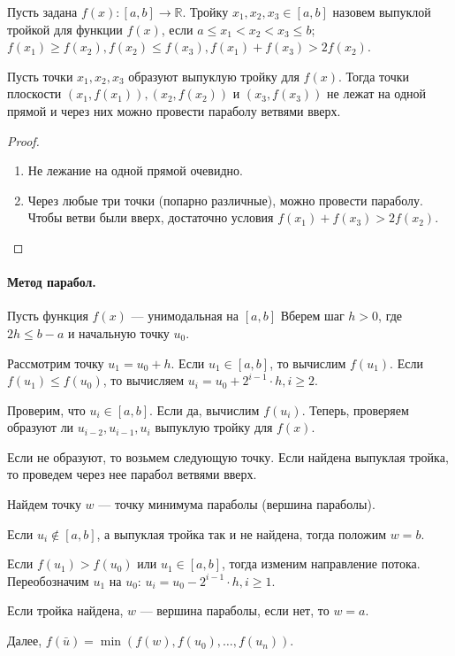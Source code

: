 
\begin{definition}
	Пусть задана $f(x): [a, b] \to \mathbb{R}$. Тройку $x_1, x_2, x_3 \in [a, b]$ назовем выпуклой тройкой для функции $f(x)$, если $a \leqslant x_1 < x_2 < x_3 \leqslant b$; $f(x_1) \geqslant f(x_2), f(x_2) \leqslant f(x_3), f(x_1) + f(x_3) > 2 f(x_2)$. 
\end{definition}

\begin{utv}
	Пусть точки $x_1, x_2, x_3$ образуют выпуклую тройку для $f(x)$.
  Тогда точки плоскости $(x_1, f(x_1)), (x_2, f(x_2))$ и $(x_3, f(x_3))$ не лежат на одной прямой и
  через них можно провести параболу ветвями вверх. 
\end{utv}
\begin{proof}
  \begin{enumerate}
    \item Не лежание на одной прямой очевидно. 
    \item Через любые три точки (попарно различные), можно провести параболу. 
      Чтобы ветви были вверх, достаточно условия $ f(x_1) + f(x_3) > 2 f(x_2)$.
  \end{enumerate}
\end{proof}

\paragraph{Метод парабол.} Пусть функция $f(x)$ --- унимодальная на $[a, b]$ Вберем шаг $h > 0$, где $2 h \leqslant b - a$ и начальную точку $u_0$.

Рассмотрим точку $u_1 = u_0 + h$. Если $u_1 \in [a, b]$, то вычислим $f(u_1)$. Если $f(u_1) \leqslant f(u_0)$, то вычисляем $u_i = u_0 + 2^{i - 1} \cdot h, i \geqslant 2$. 

Проверим, что $u_i \in [a, b]$. Если да, вычислим $f(u_i)$. Теперь, проверяем образуют ли $u_{i - 2}, u_{i - 1}, u_i$ выпуклую тройку для $f(x)$.

Если не образуют, то возьмем следующую точку. Если найдена выпуклая тройка, то проведем через нее парабол ветвями вверх. 

Найдем точку $w$ --- точку минимума параболы (вершина параболы). 

Если $u_i \not \in [a, b]$, а выпуклая тройка так и не найдена, тогда положим $w = b$. 

Если $f(u_1) > f(u_0)$ или $u_1 \in [a, b]$, тогда изменим направление потока. Переобозначим $u_1$ на $u_0$: $u_i = u_0 - 2^{i - 1} \cdot h, i \geqslant 1$.

Если тройка найдена, $w$ --- вершина параболы, если нет, то $w = a$. 

Далее, $f(\bar{u}) = \min(f(w), f(u_0), \dotsc, f(u_n))$.
